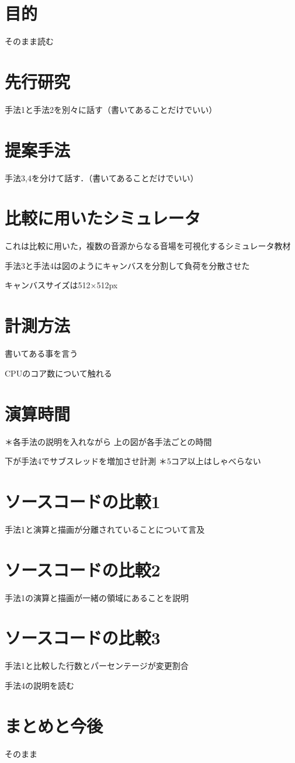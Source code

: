 \documentclass[9pt]{jsarticle}
\begin{document}
\section{目的}
そのまま読む

\section{先行研究}
手法1と手法2を別々に話す（書いてあることだけでいい）

\section{提案手法}
手法3,4を分けて話す．（書いてあることだけでいい）

\section{比較に用いたシミュレータ}
これは比較に用いた，複数の音源からなる音場を可視化するシミュレータ教材

手法3と手法4は図のようにキャンバスを分割して負荷を分散させた

キャンバスサイズは512×512px

\section{計測方法}
書いてある事を言う

CPUのコア数について触れる

\section{演算時間}
＊各手法の説明を入れながら
上の図が各手法ごとの時間

下が手法4でサブスレッドを増加させ計測
＊5コア以上はしゃべらない
\section{ソースコードの比較1}
手法1と演算と描画が分離されていることについて言及
\section{ソースコードの比較2}
手法1の演算と描画が一緒の領域にあることを説明
\section{ソースコードの比較3}
手法1と比較した行数とパーセンテージが変更割合

手法4の説明を読む
\section{まとめと今後}
そのまま
\end{document}
